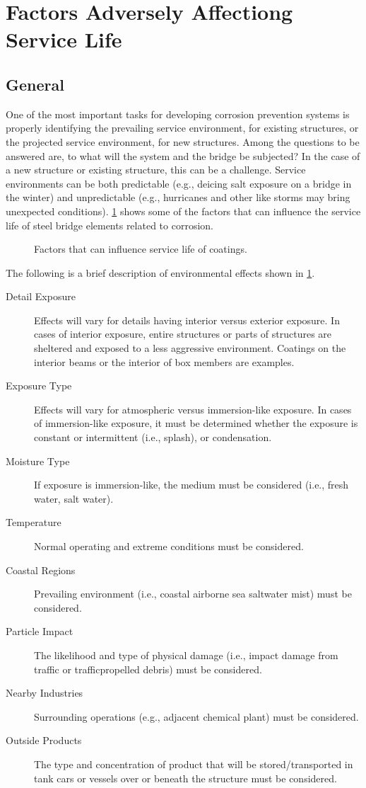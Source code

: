 \section{Factors Adversely Affectiong Service Life}
\subsection{General}
One of the most important tasks for developing corrosion prevention systems is properly identifying the
prevailing service environment, for existing structures, or the projected service environment, for new structures.
Among the questions to be answered are, to what will the system and the bridge be subjected? In the case of a new
structure or existing structure, this can be a challenge. Service environments can be both predictable (e.g., deicing
salt exposure on a bridge in the winter) and unpredictable (e.g., hurricanes and other like storms may bring
unexpected conditions). \cref{fig:faulttree-factors-coating} shows some of the factors that can influence the service life of steel bridge
elements related to corrosion.

\begin{figure}
  \caption{Factors that can influence service life of coatings.}
  \label{fig:faulttree-factors-coating}
\end{figure}

The following is a brief description of environmental effects shown in \cref{fig:faulttree-factors-coating}.

\begin{description}
  \item[Detail Exposure] Effects will vary for details having interior versus exterior exposure. In cases of interior exposure, entire structures or parts of structures are sheltered and exposed to a less aggressive environment. Coatings on the interior beams or the interior of box members are examples.
  \item[Exposure Type] Effects will vary for atmospheric versus immersion-like exposure. In cases of immersion-like exposure, it must be determined whether the exposure is constant or intermittent (i.e., splash), or condensation.
  \item[Moisture Type] If exposure is immersion-like, the medium must be considered (i.e., fresh water, salt water).
  \item[Temperature] Normal operating and extreme conditions must be considered.
  \item[Coastal Regions] Prevailing environment (i.e., coastal airborne sea saltwater mist) must be considered.
  \item[Particle Impact] The likelihood and type of physical damage (i.e., impact damage from traffic or trafficpropelled
  debris) must be considered.
  \item[Nearby Industries] Surrounding operations (e.g., adjacent chemical plant) must be considered.
  \item[Outside Products] The type and concentration of product that will be stored/transported in tank cars or vessels over or beneath the structure must be considered. 
\end{description}

